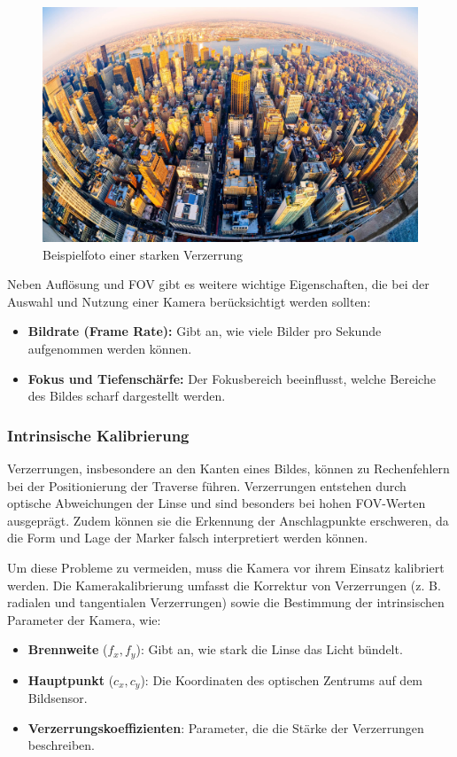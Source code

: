 \begin{figure}[H]
    \centering
    \includegraphics[width=0.5\linewidth]{graphics/fisheye.jpg}
    \caption{Beispielfoto einer starken Verzerrung}
    \label{fig:fisheye}
\end{figure}

Neben Auflösung und FOV gibt es weitere wichtige Eigenschaften, die 
bei der Auswahl und Nutzung einer Kamera berücksichtigt werden sollten:

\begin{itemize}
    \item \textbf{Bildrate (Frame Rate):} Gibt an, wie viele Bilder pro Sekunde aufgenommen werden können.
    \item \textbf{Fokus und Tiefenschärfe:} Der Fokusbereich beeinflusst, welche Bereiche des Bildes scharf dargestellt werden.
\end{itemize}


\subsubsection{Intrinsische Kalibrierung}
Verzerrungen, insbesondere an den Kanten eines Bildes, können zu Rechenfehlern 
bei der Positionierung der Traverse führen. Verzerrungen entstehen durch optische 
Abweichungen der Linse und sind besonders bei hohen FOV-Werten ausgeprägt. 
Zudem können sie die Erkennung der Anschlagpunkte erschweren, da die Form und 
Lage der Marker falsch interpretiert werden können.

Um diese Probleme zu vermeiden, muss die Kamera vor ihrem Einsatz kalibriert
werden. Die Kamerakalibrierung umfasst die Korrektur von Verzerrungen 
(z. B. radialen und tangentialen Verzerrungen) sowie die Bestimmung der 
intrinsischen Parameter der Kamera, wie:

\begin{itemize}
    \item \textbf{Brennweite} (\( f_x, f_y \)): Gibt an, wie stark die Linse das Licht bündelt.
    \item \textbf{Hauptpunkt} (\( c_x, c_y \)): Die Koordinaten des optischen Zentrums auf dem Bildsensor.
    \item \textbf{Verzerrungskoeffizienten}: Parameter, die die Stärke der Verzerrungen beschreiben.
\end{itemize}

